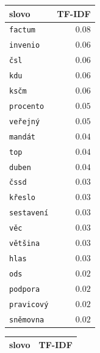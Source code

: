 \documentclass[12pt,a4paper]{report}
\begin{document}
 {


    \begin{tabular}{ |l | r | }
        \hline
        \textbf{slovo} & \textbf{TF-IDF} \\ \hline
        
        \texttt{factum} & $0.08$ \\ \hline
        \texttt{invenio} & $0.06$ \\ \hline
        \texttt{čsl} & $0.06$ \\ \hline
        \texttt{kdu} & $0.06$ \\ \hline
        \texttt{ksčm} & $0.06$ \\ \hline
        \texttt{procento} & $0.05$ \\ \hline
        \texttt{veřejný} & $0.05$ \\ \hline
        \texttt{mandát} & $0.04$ \\ \hline
        \texttt{top} & $0.04$ \\ \hline
        \texttt{duben} & $0.04$ \\ \hline
        \hline
        
        \texttt{čssd} & $0.03$ \\ \hline
        \texttt{křeslo} & $0.03$ \\ \hline
        \texttt{sestavení} & $0.03$ \\ \hline
        \texttt{věc} & $0.03$ \\ \hline
        \texttt{většina} & $0.03$ \\ \hline
        \texttt{hlas} & $0.03$ \\ \hline
        \texttt{ods} & $0.02$ \\ \hline
        \texttt{podpora} & $0.02$ \\ \hline
        \texttt{pravicový} & $0.02$ \\ \hline
        \texttt{sněmovna} & $0.02$ \\ \hline
        
      \end{tabular}

} {

    \begin{tabular}{ |l | r | }
        \hline
        \textbf{slovo} & \textbf{TF-IDF} \\ \hline
        

\end{tabular}}
\end{document}
